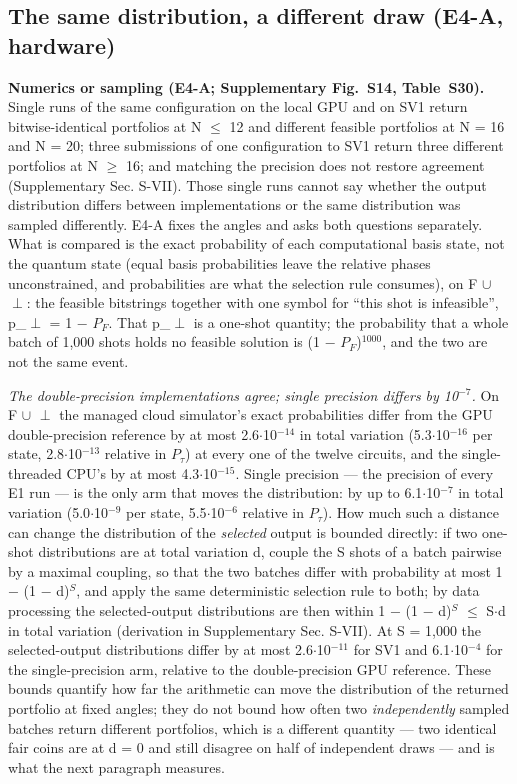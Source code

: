 \documentclass{ieeeaccess}
\begin{document}
\subsection{The same distribution, a different draw (E4-A, hardware)}


\textbf{Numerics or sampling (E4-A; Supplementary Fig.~S14, Table~S30).} Single runs of the same configuration on the local GPU and on SV1 return bitwise-identical portfolios at N $\leq$ 12 and different feasible portfolios at N = 16 and N = 20; three submissions of one configuration to SV1 return three different portfolios at N $\geq$ 16; and matching the precision does not restore agreement (Supplementary Sec. S-VII). Those single runs cannot say whether the output distribution differs between implementations or the same distribution was sampled differently. E4-A fixes the angles and asks both questions separately. What is compared is the exact probability of each computational basis state, not the quantum state (equal basis probabilities leave the relative phases unconstrained, and probabilities are what the selection rule consumes), on F $\cup$ {$\perp$}: the feasible bitstrings together with one symbol for ``this shot is infeasible'', p\_$\perp$ = 1 $-$ $P_{F}$. That p\_$\perp$ is a one-shot quantity; the probability that a whole batch of 1,000 shots holds no feasible solution is (1 $-$ $P_{F}$)$^{1000}$, and the two are not the same event.


\textit{The double-precision implementations agree; single precision differs by 10$^{-7}$.} On F $\cup$ {$\perp$} the managed cloud simulator's exact probabilities differ from the GPU double-precision reference by at most 2.6$\cdot$10$^{-14}$ in total variation (5.3$\cdot$10$^{-16}$ per state, 2.8$\cdot$10$^{-13}$ relative in $P_{\tau}$) at every one of the twelve circuits, and the single-threaded CPU's by at most 4.3$\cdot$10$^{-15}$. Single precision --- the precision of every E1 run --- is the only arm that moves the distribution: by up to 6.1$\cdot$10$^{-7}$ in total variation (5.0$\cdot$10$^{-9}$ per state, 5.5$\cdot$10$^{-6}$ relative in $P_{\tau}$). How much such a distance can change the distribution of the \textit{selected} output is bounded directly: if two one-shot distributions are at total variation d, couple the S shots of a batch pairwise by a maximal coupling, so that the two batches differ with probability at most 1 $-$ (1 $-$ d)$^{S}$, and apply the same deterministic selection rule to both; by data processing the selected-output distributions are then within 1 $-$ (1 $-$ d)$^{S}$ $\leq$ S$\cdot$d in total variation (derivation in Supplementary Sec. S-VII). At S = 1,000 the selected-output distributions differ by at most 2.6$\cdot$10$^{-11}$ for SV1 and 6.1$\cdot$10$^{-4}$ for the single-precision arm, relative to the double-precision GPU reference. These bounds quantify how far the arithmetic can move the distribution of the returned portfolio at fixed angles; they do not bound how often two \textit{independently} sampled batches return different portfolios, which is a different quantity --- two identical fair coins are at d = 0 and still disagree on half of independent draws --- and is what the next paragraph measures.
\end{document}
